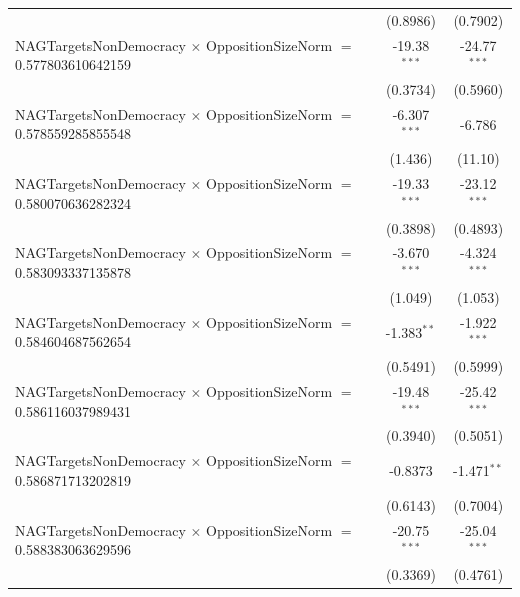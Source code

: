 \begin{tabular}{lcc}
                                                                                & (0.8986)             & (0.7902)\\   
   NAGTargetsNonDemocracy $\times$ OppositionSizeNorm $=$ 0.577803610642159     & -19.38$^{***}$       & -24.77$^{***}$\\   
                                                                                & (0.3734)             & (0.5960)\\   
   NAGTargetsNonDemocracy $\times$ OppositionSizeNorm $=$ 0.578559285855548     & -6.307$^{***}$       & -6.786\\   
                                                                                & (1.436)              & (11.10)\\   
   NAGTargetsNonDemocracy $\times$ OppositionSizeNorm $=$ 0.580070636282324     & -19.33$^{***}$       & -23.12$^{***}$\\   
                                                                                & (0.3898)             & (0.4893)\\   
   NAGTargetsNonDemocracy $\times$ OppositionSizeNorm $=$ 0.583093337135878     & -3.670$^{***}$       & -4.324$^{***}$\\   
                                                                                & (1.049)              & (1.053)\\   
   NAGTargetsNonDemocracy $\times$ OppositionSizeNorm $=$ 0.584604687562654     & -1.383$^{**}$        & -1.922$^{***}$\\   
                                                                                & (0.5491)             & (0.5999)\\   
   NAGTargetsNonDemocracy $\times$ OppositionSizeNorm $=$ 0.586116037989431     & -19.48$^{***}$       & -25.42$^{***}$\\   
                                                                                & (0.3940)             & (0.5051)\\   
   NAGTargetsNonDemocracy $\times$ OppositionSizeNorm $=$ 0.586871713202819     & -0.8373              & -1.471$^{**}$\\   
                                                                                & (0.6143)             & (0.7004)\\   
   NAGTargetsNonDemocracy $\times$ OppositionSizeNorm $=$ 0.588383063629596     & -20.75$^{***}$       & -25.04$^{***}$\\   
                                                                                & (0.3369)             & (0.4761)\\   

\end{tabular}

